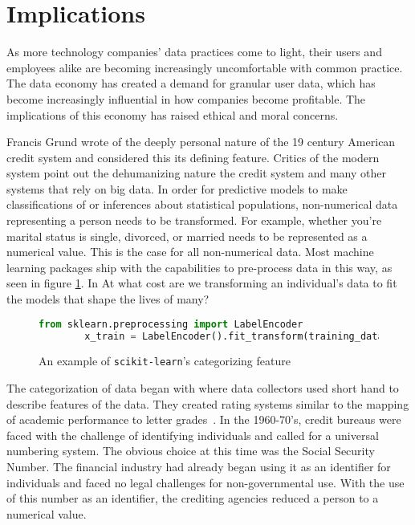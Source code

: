 \section{Implications}
As more technology companies' data practices come to light, their users and
employees alike are becoming increasingly uncomfortable with common practice.
The data economy has created a demand for granular user data, which has become
increasingly influential in how companies become profitable. The implications
of this economy has raised ethical and moral concerns.

Francis Grund wrote of the deeply personal nature of the 19 century
American credit system and considered this its defining feature. Critics of the
modern system point out the dehumanizing nature the credit system and many
other systems that rely on big data. In order for predictive models to make
classifications of or inferences about statistical populations, non-numerical
data representing a person needs to be transformed. For example, whether you're
marital status is single, divorced, or married needs to be represented as a
numerical value. This is the case for all non-numerical data. Most machine learning
packages ship with the capabilities to pre-process data in this way, as seen in figure \ref{fig:scikit}. In At what cost are
we transforming an individual's data to fit the models that shape the lives of
many?

\begin{figure}[h]
\begin{lstlisting}[language=python, basicstyle=\sffamily]
        from sklearn.preprocessing import LabelEncoder
        x_train = LabelEncoder().fit_transform(training_data)
\end{lstlisting}
\caption{An example of \texttt{scikit-learn}'s categorizing feature~\cite{scikit-learn}}
		\label{fig:scikit}
\end{figure}

The categorization of data began with \mca where data collectors used short
hand to describe features of the data. They created rating systems similar to
the mapping of academic performance to letter
grades~\cite{lauer2017creditworthy}. In the 1960-70's, credit bureaus were
faced with the challenge of identifying individuals and called for a universal
numbering system. The obvious choice at this time was the Social Security
Number. The financial industry had already began using it as an identifier for
individuals and faced no legal challenges for non-governmental use. With the
use of this number as an identifier, the crediting agencies reduced a person to
a numerical value.

